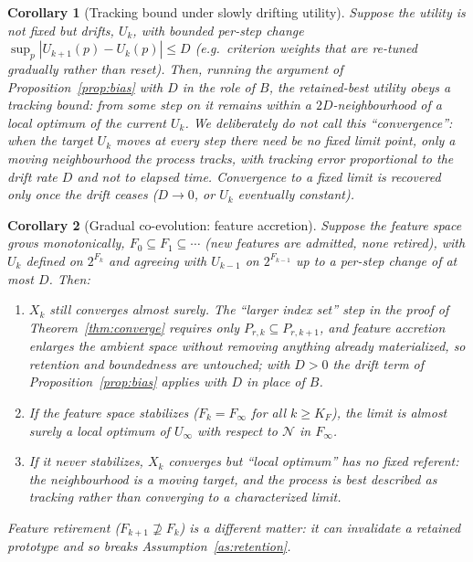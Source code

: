 \documentclass[11pt]{article}
\newtheorem{corollary}{Corollary}
\begin{document}
\begin{corollary}[Tracking bound under slowly drifting utility]
\label{cor:drift}
Suppose the utility is not fixed but drifts, $U_k$, with bounded per-step change $\sup_p |U_{k+1}(p)-U_k(p)|\le D$ (e.g.\ criterion weights that are re-tuned gradually rather than reset). Then, running the argument of Proposition~\ref{prop:bias} with $D$ in the role of $B$, the retained-best utility obeys a \emph{tracking bound}: from some step on it remains within a $2D$-neighbourhood of a local optimum of the \emph{current} $U_k$. We deliberately do \emph{not} call this ``convergence'': when the target $U_k$ moves at every step there need be no fixed limit point, only a moving neighbourhood the process tracks, with tracking error proportional to the drift rate $D$ and not to elapsed time. Convergence to a fixed limit is recovered only once the drift ceases ($D\to0$, or $U_k$ eventually constant).
\end{corollary}

\begin{corollary}[Gradual co-evolution: feature accretion]
\label{cor:accretion}
Suppose the feature space grows monotonically, $F_0\subseteq F_1\subseteq\cdots$ (new features are admitted, none retired), with $U_k$ defined on $2^{F_k}$ and agreeing with $U_{k-1}$ on $2^{F_{k-1}}$ up to a per-step change of at most $D$. Then:
\begin{enumerate}[label=(\roman*)]
\item $X_k$ still converges almost surely. The ``larger index set'' step in the proof of Theorem~\ref{thm:converge} requires only $P_{r,k}\subseteq P_{r,k+1}$, and feature accretion \emph{enlarges} the ambient space without removing anything already materialized, so retention and boundedness are untouched; with $D>0$ the drift term of Proposition~\ref{prop:bias} applies with $D$ in place of $B$.
\item If the feature space stabilizes ($F_k=F_\infty$ for all $k\ge K_F$), the limit is almost surely a local optimum of $U_\infty$ with respect to $\mathcal{N}$ in $F_\infty$.
\item If it never stabilizes, $X_k$ converges but ``local optimum'' has no fixed referent: the neighbourhood is a moving target, and the process is best described as tracking rather than converging to a characterized limit.
\end{enumerate}
Feature \emph{retirement} ($F_{k+1}\not\supseteq F_k$) is a different matter: it can invalidate a retained prototype and so breaks Assumption~\ref{as:retention}.
\end{corollary}
\end{document}
